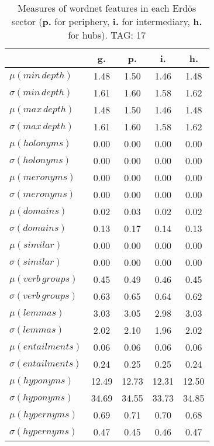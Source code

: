 \begin{table}[h!]
\begin{center}
\begin{tabular}{| l || c | c | c | c |}\hline
 & {\bf g.} & {\bf p.} & {\bf i.} & {\bf h.} \\\hline\hline
$\mu(min\,depth)$ & 1.48  & 1.50  & 1.46  & 1.48 \\
$\sigma(min\,depth)$ & 1.61  & 1.60  & 1.58  & 1.62 \\\hline
$\mu(max\,depth)$ & 1.48  & 1.50  & 1.46  & 1.48 \\
$\sigma(max\,depth)$ & 1.61  & 1.60  & 1.58  & 1.62 \\\hline
$\mu(holonyms)$ & 0.00  & 0.00  & 0.00  & 0.00 \\
$\sigma(holonyms)$ & 0.00  & 0.00  & 0.00  & 0.00 \\\hline
$\mu(meronyms)$ & 0.00  & 0.00  & 0.00  & 0.00 \\
$\sigma(meronyms)$ & 0.00  & 0.00  & 0.00  & 0.00 \\\hline
$\mu(domains)$ & 0.02  & 0.03  & 0.02  & 0.02 \\
$\sigma(domains)$ & 0.13  & 0.17  & 0.14  & 0.13 \\\hline
$\mu(similar)$ & 0.00  & 0.00  & 0.00  & 0.00 \\
$\sigma(similar)$ & 0.00  & 0.00  & 0.00  & 0.00 \\\hline
$\mu(verb\,groups)$ & 0.45  & 0.49  & 0.46  & 0.45 \\
$\sigma(verb\,groups)$ & 0.63  & 0.65  & 0.64  & 0.62 \\\hline
$\mu(lemmas)$ & 3.03  & 3.05  & 2.98  & 3.03 \\
$\sigma(lemmas)$ & 2.02  & 2.10  & 1.96  & 2.02 \\\hline
$\mu(entailments)$ & 0.06  & 0.06  & 0.06  & 0.06 \\
$\sigma(entailments)$ & 0.24  & 0.25  & 0.25  & 0.24 \\\hline
$\mu(hyponyms)$ & 12.49  & 12.73  & 12.31  & 12.50 \\
$\sigma(hyponyms)$ & 34.69  & 34.55  & 33.73  & 34.85 \\\hline
$\mu(hypernyms)$ & 0.69  & 0.71  & 0.70  & 0.68 \\
$\sigma(hypernyms)$ & 0.47  & 0.45  & 0.46  & 0.47 \\\hline
\end{tabular}
\caption{Measures of wordnet features in each Erd\"os sector ({{\bf p.}} for periphery, {{\bf i.}} for intermediary, {{\bf h.}} for hubs). TAG: 17}
\end{center}
\end{table}